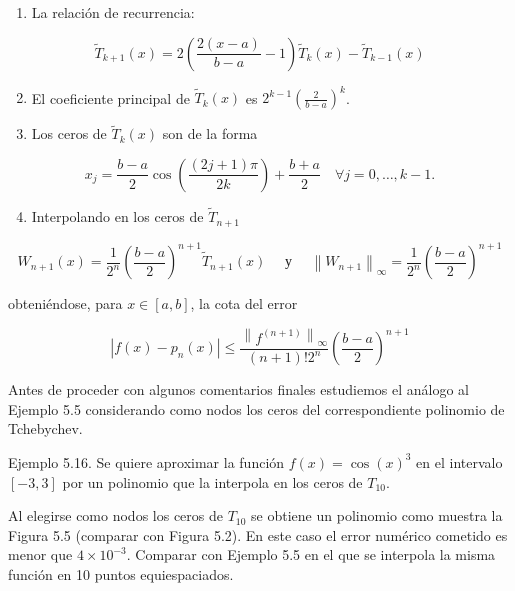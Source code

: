 \documentclass[10pt]{article}
\begin{document}
\begin{enumerate}
  \item La relación de recurrencia:
\end{enumerate}

$$
\widetilde{T}_{k+1}(x)=2\left(\frac{2(x-a)}{b-a}-1\right) \widetilde{T}_{k}(x)-\widetilde{T}_{k-1}(x)
$$

\begin{enumerate}
  \setcounter{enumi}{1}
  \item El coeficiente principal de $\widetilde{T}_{k}(x)$ es $2^{k-1}\left(\frac{2}{b-a}\right)^{k}$.
  \item Los ceros de $\widetilde{T}_{k}(x)$ son de la forma
\end{enumerate}

$$
x_{j}=\frac{b-a}{2} \cos \left(\frac{(2 j+1) \pi}{2 k}\right)+\frac{b+a}{2} \quad \forall j=0, \ldots, k-1 .
$$

\begin{enumerate}
  \setcounter{enumi}{3}
  \item Interpolando en los ceros de $\widetilde{T}_{n+1}$
\end{enumerate}

$$
W_{n+1}(x)=\frac{1}{2^{n}}\left(\frac{b-a}{2}\right)^{n+1} \widetilde{T}_{n+1}(x) \quad \text { у } \quad\left\|W_{n+1}\right\|_{\infty}=\frac{1}{2^{n}}\left(\frac{b-a}{2}\right)^{n+1}
$$

obteniéndose, para $x \in[a, b]$, la cota del error

$$
\left|f(x)-p_{n}(x)\right| \leq \frac{\left\|f^{(n+1)}\right\|_{\infty}}{(n+1)!2^{n}}\left(\frac{b-a}{2}\right)^{n+1}
$$

Antes de proceder con algunos comentarios finales estudiemos el análogo al Ejemplo 5.5 considerando como nodos los ceros del correspondiente polinomio de Tchebychev.

Ejemplo 5.16. Se quiere aproximar la función $f(x)=\cos (x)^{3}$ en el intervalo $[-3,3]$ por un polinomio que la interpola en los ceros de $T_{10}$.

Al elegirse como nodos los ceros de $T_{10}$ se obtiene un polinomio como muestra la Figura 5.5 (comparar con Figura 5.2). En este caso el error numérico cometido es menor que $4 \times 10^{-3}$. Comparar con Ejemplo 5.5 en el que se interpola la misma función en 10 puntos equiespaciados.
\end{document}
